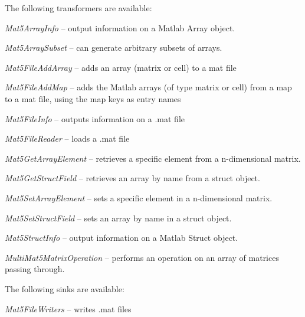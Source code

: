 \documentclass[a4paper]{book}
\begin{document}
The following transformers are available:
\begin{tight_itemize}
  \item \textit{Mat5ArrayInfo} -- output information on a Matlab Array object.
  \item \textit{Mat5ArraySubset} -- can generate arbitrary subsets of arrays.
  \item \textit{Mat5FileAddArray} -- adds an array (matrix or cell) to a mat file
  \item \textit{Mat5FileAddMap} -- adds the Matlab arrays (of type matrix or cell) from a map to a mat file, using the map keys as entry names
  \item \textit{Mat5FileInfo} -- outputs information on a .mat file
  \item \textit{Mat5FileReader} -- loads a .mat file
  \item \textit{Mat5GetArrayElement} -- retrieves a specific element from a n-dimensional matrix.
  \item \textit{Mat5GetStructField} -- retrieves an array by name from a struct object.
  \item \textit{Mat5SetArrayElement} -- sets a specific element in a n-dimensional matrix.
  \item \textit{Mat5SetStructField} -- sets an array by name in a struct object.
  \item \textit{Mat5StructInfo} -- output information on a Matlab Struct object.
  \item \textit{MultiMat5MatrixOperation} -- performs an operation on an array of matrices passing through.
\end{tight_itemize}

The following sinks are available:
\begin{tight_itemize}
  \item \textit{Mat5FileWriters} -- writes .mat files
\end{tight_itemize}
\end{document}
